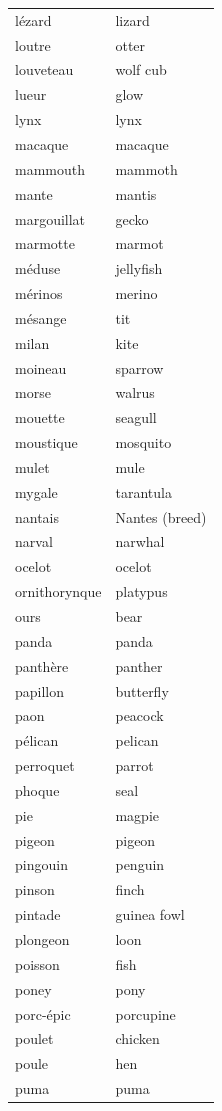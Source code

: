 \documentclass[12pt,a4paper]{article}
\begin{document}
\begin{longtable}{p{4cm} p{6cm}}
lézard & lizard \\
loutre & otter \\
louveteau & wolf cub \\
lueur & glow \\
lynx & lynx \\
macaque & macaque \\
mammouth & mammoth \\
mante & mantis \\
margouillat & gecko \\
marmotte & marmot \\
méduse & jellyfish \\
mérinos & merino \\
mésange & tit \\
milan & kite \\
moineau & sparrow \\
morse & walrus \\
mouette & seagull \\
moustique & mosquito \\
mulet & mule \\
mygale & tarantula \\
nantais & Nantes (breed) \\
narval & narwhal \\
ocelot & ocelot \\
ornithorynque & platypus \\
ours & bear \\
panda & panda \\
panthère & panther \\
papillon & butterfly \\
paon & peacock \\
pélican & pelican \\
perroquet & parrot \\
phoque & seal \\
pie & magpie \\
pigeon & pigeon \\
pingouin & penguin \\
pinson & finch \\
pintade & guinea fowl \\
plongeon & loon \\
poisson & fish \\
poney & pony \\
porc-épic & porcupine \\
poulet & chicken \\
poule & hen \\
puma & puma \\

\end{longtable}
\end{document}
